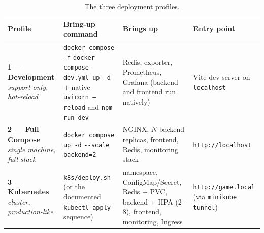 \documentclass{scrartcl}
\begin{document}
\begin{table}
      \centering
      \footnotesize
      \setlength{\tabcolsep}{6pt}
      \renewcommand{\arraystretch}{1.25}
      \caption{The three deployment profiles.}
      \label{tab:profiles}
      \begin{tabular}{@{}
            >{\raggedright\arraybackslash}p{2.6cm}
            >{\raggedright\arraybackslash}p{4.2cm}
            >{\raggedright\arraybackslash}p{3.8cm}
            >{\raggedright\arraybackslash}p{2.6cm}@{}}
            \toprule
            \textbf{Profile} & \textbf{Bring-up command}                                                 & \textbf{Brings up}
                             & \textbf{Entry point}                                                                           \\
            \midrule
            \textbf{1 --- Development} \newline \emph{support only, hot-reload}
                             & \texttt{docker compose -f} \texttt{docker-compose-dev.yml up -d}
            \newline $+$ native \texttt{uvicorn --reload} and \texttt{npm run dev}
                             & Redis, exporter, Prometheus, Grafana (backend and frontend run natively)
                             & Vite dev server on \texttt{localhost}                                                          \\
            \addlinespace
            \textbf{2 --- Full Compose} \newline \emph{single machine, full stack}
                             & \texttt{docker compose up -d} \texttt{-{}-scale backend=2}
                             & NGINX, $N$ backend replicas, frontend, Redis, monitoring stack
                             & \texttt{http://localhost}                                                                      \\
            \addlinespace
            \textbf{3 --- Kubernetes} \newline \emph{cluster, production-like}
                             & \texttt{k8s/deploy.sh} \newline (or the documented \texttt{kubectl apply}
            sequence)
                             & namespace, ConfigMap/Secret, Redis $+$ PVC, backend $+$ HPA (2--8),
            frontend, monitoring, Ingress
                             & \texttt{http://game.local} \newline (via \texttt{minikube tunnel})                             \\
            \bottomrule
      \end{tabular}
\end{table}
\end{document}
